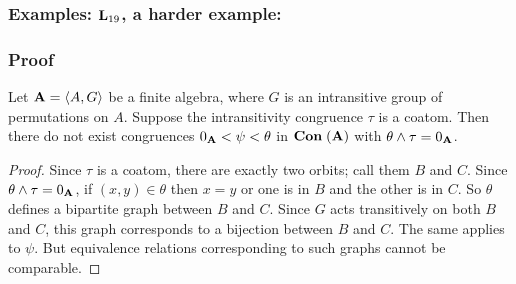 \documentclass[12 pt]{beamer}
\begin{document}
\begin{frame}[t]
  \frametitle{Examples: $\mathbf{L}_{19}$, a harder example:}

\vspace{-10 mm}

\begin{center}
\end{center}





\end{frame}

\begin{frame}[t]
  \frametitle{Proof}

\begin{lemma}
Let $\mathbf{A} = \langle A,G\rangle$ be a finite algebra, where
$G$ is an intransitive group of permutations on $A$.
Suppose the intransitivity congruence $\tau$ is a coatom.
Then there do not exist congruences
$0_{\mathbf{A}} < \psi < \theta$ in $\mathbf{Con}\;\mathbf{(}\mathbf{A})$
with $\theta \meet \tau = 0_{\alg A}$. 
\end{lemma}

\begin{proof}
Since $\tau$ is a coatom, there are exactly two orbits; call
them $B$ and $C$. Since $\theta \meet \tau = 0_{\alg A}$, if
$(x,y) \in \theta$ then $x=y$ or one is in $B$ and the other
is in $C$. So $\theta$ defines a bipartite graph between
$B$ and $C$. Since $G$ acts transitively on both $B$ and $C$,
this graph corresponds to a bijection between $B$ and $C$. 
The same applies to $\psi$. But equivalence relations
corresponding to such graphs cannot be comparable.
\end{proof}

  
\end{frame}
\end{document}
